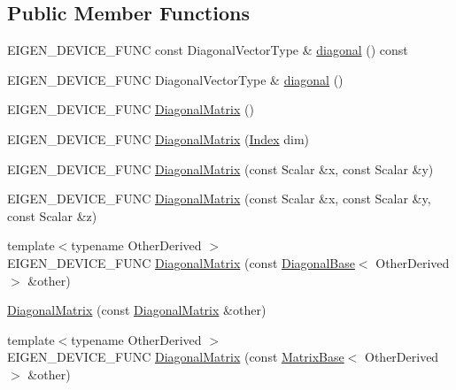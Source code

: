 \subsection*{Public Member Functions}
\begin{DoxyCompactItemize}
\item 
E\+I\+G\+E\+N\+\_\+\+D\+E\+V\+I\+C\+E\+\_\+\+F\+U\+NC const Diagonal\+Vector\+Type \& \mbox{\hyperlink{class_eigen_1_1_diagonal_matrix_aa17bf78369fc6f541056b5b5a696f73b}{diagonal}} () const
\item 
E\+I\+G\+E\+N\+\_\+\+D\+E\+V\+I\+C\+E\+\_\+\+F\+U\+NC Diagonal\+Vector\+Type \& \mbox{\hyperlink{class_eigen_1_1_diagonal_matrix_aea4c301c837d0af2fdab5d7d1f32c97d}{diagonal}} ()
\item 
E\+I\+G\+E\+N\+\_\+\+D\+E\+V\+I\+C\+E\+\_\+\+F\+U\+NC \mbox{\hyperlink{class_eigen_1_1_diagonal_matrix_a828c0f7d55a4f66908e76b3af1acc37f}{Diagonal\+Matrix}} ()
\item 
E\+I\+G\+E\+N\+\_\+\+D\+E\+V\+I\+C\+E\+\_\+\+F\+U\+NC \mbox{\hyperlink{class_eigen_1_1_diagonal_matrix_a82e6fd9b8f7f614bc05b4f941a875d7a}{Diagonal\+Matrix}} (\mbox{\hyperlink{struct_eigen_1_1_eigen_base_a554f30542cc2316add4b1ea0a492ff02}{Index}} dim)
\item 
E\+I\+G\+E\+N\+\_\+\+D\+E\+V\+I\+C\+E\+\_\+\+F\+U\+NC \mbox{\hyperlink{class_eigen_1_1_diagonal_matrix_a1443056b287f069d6771d7945e45ad60}{Diagonal\+Matrix}} (const Scalar \&x, const Scalar \&y)
\item 
E\+I\+G\+E\+N\+\_\+\+D\+E\+V\+I\+C\+E\+\_\+\+F\+U\+NC \mbox{\hyperlink{class_eigen_1_1_diagonal_matrix_aebf160f0165e6602249cbe03148f6c04}{Diagonal\+Matrix}} (const Scalar \&x, const Scalar \&y, const Scalar \&z)
\item 
{\footnotesize template$<$typename Other\+Derived $>$ }\\E\+I\+G\+E\+N\+\_\+\+D\+E\+V\+I\+C\+E\+\_\+\+F\+U\+NC \mbox{\hyperlink{class_eigen_1_1_diagonal_matrix_ad7d030d35ab1f1b2f3e51860069f4226}{Diagonal\+Matrix}} (const \mbox{\hyperlink{class_eigen_1_1_diagonal_base}{Diagonal\+Base}}$<$ Other\+Derived $>$ \&other)
\item 
\mbox{\hyperlink{class_eigen_1_1_diagonal_matrix_ad5efd7a4e35667a76cdbbdb664bb92c5}{Diagonal\+Matrix}} (const \mbox{\hyperlink{class_eigen_1_1_diagonal_matrix}{Diagonal\+Matrix}} \&other)
\item 
{\footnotesize template$<$typename Other\+Derived $>$ }\\E\+I\+G\+E\+N\+\_\+\+D\+E\+V\+I\+C\+E\+\_\+\+F\+U\+NC \mbox{\hyperlink{class_eigen_1_1_diagonal_matrix_a3a6492f390f0d881f14376e673fd42c3}{Diagonal\+Matrix}} (const \mbox{\hyperlink{class_eigen_1_1_matrix_base}{Matrix\+Base}}$<$ Other\+Derived $>$ \&other)

\end{DoxyCompactItemize}
